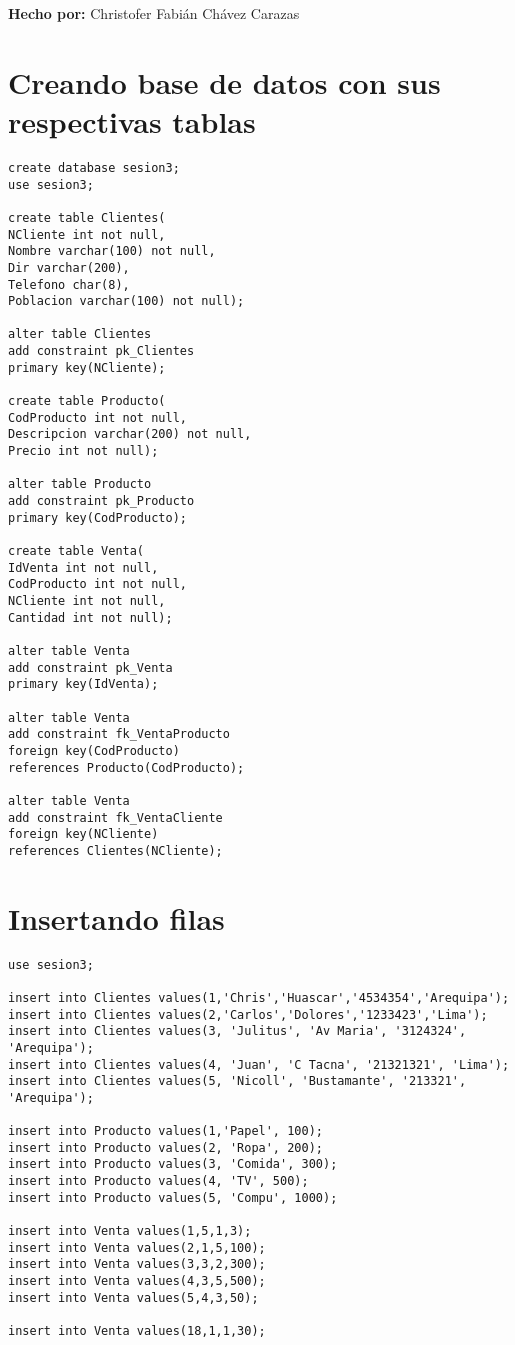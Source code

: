 \documentclass[a4paper,12pt]{article}
\begin{document}
\begin{Large}
\textbf{Hecho por:} Christofer Fabián Chávez Carazas
\end{Large}

\section{Creando base de datos con sus respectivas tablas}

\begin{lstlisting}
create database sesion3;
use sesion3;

create table Clientes(
NCliente int not null,
Nombre varchar(100) not null,
Dir varchar(200),
Telefono char(8),
Poblacion varchar(100) not null);

alter table Clientes
add constraint pk_Clientes
primary key(NCliente);

create table Producto(
CodProducto int not null,
Descripcion varchar(200) not null,
Precio int not null);

alter table Producto
add constraint pk_Producto
primary key(CodProducto);

create table Venta(
IdVenta int not null,
CodProducto int not null,
NCliente int not null,
Cantidad int not null);

alter table Venta
add constraint pk_Venta
primary key(IdVenta);

alter table Venta
add constraint fk_VentaProducto
foreign key(CodProducto)
references Producto(CodProducto);

alter table Venta
add constraint fk_VentaCliente
foreign key(NCliente)
references Clientes(NCliente);

\end{lstlisting}

\section{Insertando filas}

\begin{lstlisting}
use sesion3;

insert into Clientes values(1,'Chris','Huascar','4534354','Arequipa');
insert into Clientes values(2,'Carlos','Dolores','1233423','Lima');
insert into Clientes values(3, 'Julitus', 'Av Maria', '3124324', 'Arequipa');
insert into Clientes values(4, 'Juan', 'C Tacna', '21321321', 'Lima');
insert into Clientes values(5, 'Nicoll', 'Bustamante', '213321', 'Arequipa');

insert into Producto values(1,'Papel', 100);
insert into Producto values(2, 'Ropa', 200);
insert into Producto values(3, 'Comida', 300);
insert into Producto values(4, 'TV', 500);
insert into Producto values(5, 'Compu', 1000);

insert into Venta values(1,5,1,3);
insert into Venta values(2,1,5,100);
insert into Venta values(3,3,2,300);
insert into Venta values(4,3,5,500);
insert into Venta values(5,4,3,50);

insert into Venta values(18,1,1,30);
\end{lstlisting}
\end{document}
